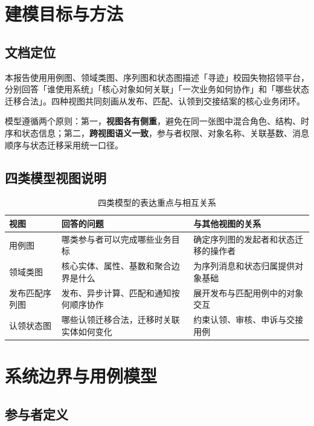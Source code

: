 \section{建模目标与方法}

\subsection{文档定位}

本报告使用用例图、领域类图、序列图和状态图描述「寻迹」校园失物招领平台，分别回答「谁使用系统」「核心对象如何关联」「一次业务如何协作」和「哪些状态迁移合法」。四种视图共同刻画从发布、匹配、认领到交接结案的核心业务闭环。

模型遵循两个原则：第一，\textbf{视图各有侧重}，避免在同一张图中混合角色、结构、时序和状态信息；第二，\textbf{跨视图语义一致}，参与者权限、对象名称、关联基数、消息顺序与状态迁移采用统一口径。

\subsection{四类模型视图说明}

\begin{table}[H]
  \centering
  \caption{四类模型的表达重点与相互关系}
  \begin{tabularx}{\textwidth}{L{2.4cm} L{4.2cm} Y}
    \toprule
    视图 & 回答的问题 & 与其他视图的关系 \\
    \midrule
    用例图 & 哪类参与者可以完成哪些业务目标 & 确定序列图的发起者和状态迁移的操作者 \\
    领域类图 & 核心实体、属性、基数和聚合边界是什么 & 为序列消息和状态归属提供对象基础 \\
    发布匹配序列图 & 发布、异步计算、匹配和通知按何顺序协作 & 展开发布与匹配用例中的对象交互 \\
    认领状态图 & 哪些认领迁移合法，迁移时关联实体如何变化 & 约束认领、审核、申诉与交接用例 \\
    \bottomrule
  \end{tabularx}
\end{table}

\section{系统边界与用例模型}

\subsection{参与者定义}

